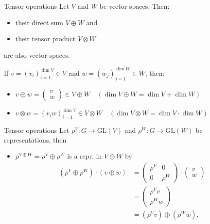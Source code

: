 \documentclass[handout,  12pt]{beamer}
\newcommand{\1}{\mathbf{1}}
\newcommand{\0}{\mathbf{0}}
\newcommand{\GL}{\text{GL}}
\newcommand{\Ss}{\scriptstyle}
\begin{document}
	\begin{frame}{Tensor operations}
		Let $V$ and $W$ be vector spaces. Then:
		\begin{itemize}
			\item their direct sum $V \oplus W$ and
			\item their tensor product $V \otimes W$
		\end{itemize}
		are also vector spaces.

		If $v = (v_i)_{i=1}^{\dim V} \in V$ and $w = (w_j)_{j=1}^{\dim W} \in W$, then:
		\begin{itemize}
			\item $v \oplus w = \begin{pmatrix}
				v \\ w
			\end{pmatrix} \in V \oplus W \quad \Ss (\dim V \oplus W = \dim V + \dim W)$
			\item $v \otimes w = (v_iw)_{i=1}^{\dim V} \in V \otimes W \quad \Ss(\dim V \otimes W = \dim V \cdot \dim W)$
		\end{itemize}
		
		

	\end{frame}
	\begin{frame}{Tensor operations}
		Let $\rho^V: G \rightarrow \GL(V)$ and $\rho^W: G \rightarrow \GL(W)$ be representations, then 
		\begin{itemize}
			\item $\rho^{V \oplus W} = \rho^V \oplus \rho^W$ is a repr. in $V \oplus W$ by 
			\begin{align*}
			(	\rho^V \oplus \rho^W) \cdot (v \oplus w) &= \begin{pmatrix}
				\rho^V & 0 \\ 0 & \rho^W
			\end{pmatrix} \cdot \begin{pmatrix}
			v \\ w
			\end{pmatrix} \\
			&= \begin{pmatrix}
				\rho^V  v \\ \rho^W  w
			\end{pmatrix} \\
			&= (\rho^V v) \oplus (\rho^W w).
			\end{align*}
		\end{itemize}
	\end{frame}
	
\end{document}

